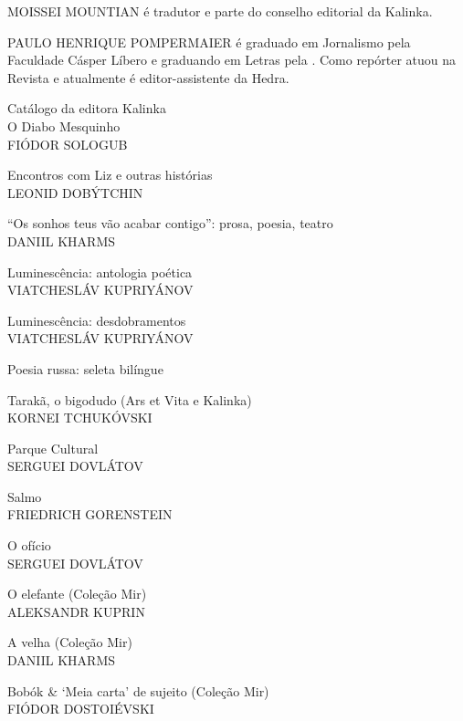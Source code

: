 \noindent{}MOISSEI MOUNTIAN é tradutor e parte do conselho editorial da Kalinka.

\medskip

\noindent{}PAULO HENRIQUE POMPERMAIER é graduado em Jornalismo pela Faculdade Cásper Líbero e graduando em Letras pela . Como repórter atuou na Revista  e atualmente é editor-assistente da Hedra.

\afterpage{\blankpage}

\newpage
\pagestyle{empty}
\MyriadPro

\noindent{}Catálogo da editora Kalinka\\[5pt]

\noindent{}O Diabo Mesquinho\\
FIÓDOR SOLOGUB
\medskip

\noindent{}Encontros com Liz e outras histórias\\
LEONID DOBÝTCHIN
\medskip

\noindent{}``Os sonhos teus vão acabar contigo'': prosa, poesia, teatro\\
DANIIL KHARMS
\medskip

\noindent{}Luminescência: antologia poética\\
VIATCHESLÁV KUPRIYÁNOV
\medskip

\noindent{}Luminescência: desdobramentos\\
VIATCHESLÁV KUPRIYÁNOV
\medskip

\noindent{}Poesia russa: seleta bilíngue
\medskip

\noindent{}Tarakã, o bigodudo (Ars et Vita e Kalinka)\\
KORNEI TCHUKÓVSKI
\medskip

\noindent{}Parque Cultural\\
SERGUEI DOVLÁTOV
\medskip

\noindent{}Salmo\\
FRIEDRICH GORENSTEIN
\medskip

\noindent{}O ofício\\
SERGUEI DOVLÁTOV
\medskip

\noindent{}O elefante (Coleção Mir)\\
ALEKSANDR KUPRIN
\medskip

\noindent{}A velha (Coleção Mir)\\
DANIIL KHARMS 
\medskip

\noindent{}Bobók \& `Meia carta' de sujeito (Coleção Mir)\\
FIÓDOR DOSTOIÉVSKI
\medskip

